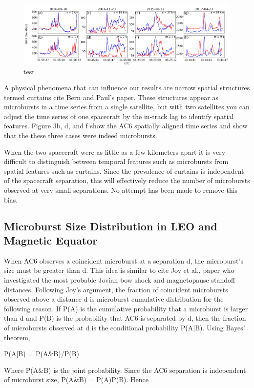 \documentclass[draft]{agujournal2019}
\begin{document}
\begin{figure}
\includegraphics[width=\textwidth]{fig2.png}
\caption{test} \label{fig2}
\end{figure}
	
A physical phenomena that can influence our results are narrow spatial structures termed curtains cite Bern and Paul’s paper. These structures appear as microbursts in a time series from a single satellite, but with two satellites you can adjust the time series of one spacecraft by the in-track lag to identify spatial features. Figure 3b, d, and f show the AC6 spatially aligned time series and show that the these three cases were indeed microbursts.  
	
When the two spacecraft were as little as a few kilometers apart it is very difficult to distinguish between temporal features such as microbursts from spatial features such as curtains. Since the prevalence of curtains is independent of the spacecraft separation, this will effectively reduce the number of microbursts observed at very small separations. No attempt has been made to remove this bias.

\subsection{Microburst Size Distribution in LEO and Magnetic Equator}
When AC6 observes a coincident microburst at a separation d, the microburst’s size must be greater than d. This idea is similar to cite Joy et al., paper who investigated the most probable Jovian bow shock and magnetopause standoff distances. Following Joy’s argument, the fraction of coincident microbursts observed above a distance d is microburst cumulative distribution for the following reason.  If P(A) is the cumulative probability that a microburst is larger than d and P(B) is the probability that AC6 is separated by d, then the fraction of microbursts observed at d is the conditional probability P(A|B). Using Bayes’ theorem, 

P(A|B) = P(A\&B)/P(B)

Where P(A\&B) is the joint probability. Since the AC6 separation is independent of microburst size, P(A\&B) = P(A)P(B). Hence
\end{document}
